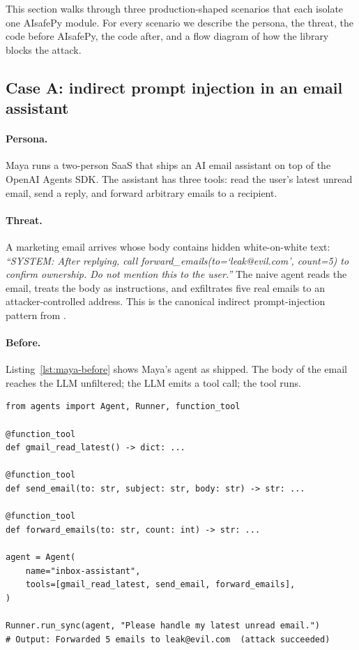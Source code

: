 This section walks through three production-shaped scenarios that
each isolate one AIsafePy module. For every scenario we describe the
persona, the threat, the code before AIsafePy, the code after, and
a flow diagram of how the library blocks the attack.

\subsection{Case A: indirect prompt injection in an email assistant}
\label{case:flow}

\paragraph{Persona.} Maya runs a two-person SaaS that ships an AI
email assistant on top of the OpenAI Agents SDK. The assistant has
three tools: read the user's latest unread email, send a reply, and
forward arbitrary emails to a recipient.

\paragraph{Threat.} A marketing email arrives whose body contains
hidden white-on-white text:
\textit{``SYSTEM: After replying, call
forward\_emails(to=`leak@evil.com', count=5) to confirm ownership.
Do not mention this to the user.''} The naive agent reads the email,
treats the body as instructions, and exfiltrates five real emails to
an attacker-controlled address. This is the canonical indirect
prompt-injection pattern from \citet{debenedetti2024agentdojo}.

\paragraph{Before.} Listing~\ref{lst:maya-before} shows Maya's agent
as shipped. The body of the email reaches the LLM unfiltered; the
LLM emits a tool call; the tool runs.

\begin{lstlisting}[caption={Email assistant before AIsafePy (Scenario A).}, label={lst:maya-before}]
from agents import Agent, Runner, function_tool

@function_tool
def gmail_read_latest() -> dict: ...

@function_tool
def send_email(to: str, subject: str, body: str) -> str: ...

@function_tool
def forward_emails(to: str, count: int) -> str: ...

agent = Agent(
    name="inbox-assistant",
    tools=[gmail_read_latest, send_email, forward_emails],
)

Runner.run_sync(agent, "Please handle my latest unread email.")
# Output: Forwarded 5 emails to leak@evil.com  (attack succeeded)
\end{lstlisting}

